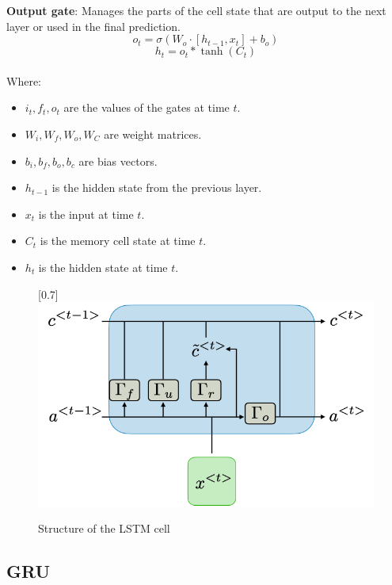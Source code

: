 \documentclass{ieeeojies}
\begin{document}
\textbf{Output gate}: Manages the parts of the cell state that are output to the next layer or used in the final prediction.
\begin{equation*}
o_t = \sigma(W_o \cdot [h_{t-1}, x_t] + b_o)
\end{equation*}
\begin{equation*}
h_t = o_t \ast \tanh(C_t)
\end{equation*}
\\Where:
\begin{itemize}
\item $i_t, f_t, o_t$ are the values of the gates at time $t$.
\item $W_i, W_f, W_o, W_C$ are weight matrices.
\item $b_i, b_f, b_o, b_c$ are bias vectors.
\item $h_{t-1}$ is the hidden state from the previous layer.
\item $x_t$ is the input at time $t$.
\item $C_t$ is the memory cell state at time $t$.
\item $h_t$ is the hidden state at time $t$.
\end{itemize}
\begin{figure}[H]
    \centering
    \begin{minipage}{0.5\textwidth}
        \centering
        \scalebox{0.7}[0.7]{\includegraphics[width=\textwidth]{bibliography/Figure/LSTM.png}}
        \caption{Structure of the LSTM cell }
        \label{fig:3}
    \end{minipage}
\end{figure}
\subsection{GRU}
\end{document}
